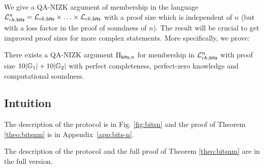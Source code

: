We give a QA-NIZK argument of membership in the language $\mathcal{L}_{ck,\mathsf{bits}}^n  = \mathcal{L}_{ck,\mathsf{bits}} \times \ldots \times \mathcal{L}_{ck,\mathsf{bits}}$ with a proof size which is independent of $n$ (but with a loss factor in the proof of soundness of $n$). The result will be crucial to get improved proof sizes for more complex statements. More specifically, we prove: 

\begin{theorem} \label{theo:bitsnm} There exists a QA-NIZK argument $\Pi_{\mathsf{bits},n}$  for membership in $\mathcal{L}_{ck,\mathsf{bits}}^n$ with proof size  
$10|\mathbb{G}_1|+10|\mathbb{G}_2|$ with perfect completeness, perfect-zero knowledge and computational soundness. 
\end{theorem}

\iffull
\subsection{Intuition}
 
\fi

\iffull
The description of the protocol is in Fig. \ref{fig:bitsn} and the proof of Theorem \ref{theo:bitsnm} is in Appendix~\ref{app:bits-n}.

\else
The description of the protocol and the full proof of Theorem \ref{theo:bitsnm} are in the full version.
\fi

